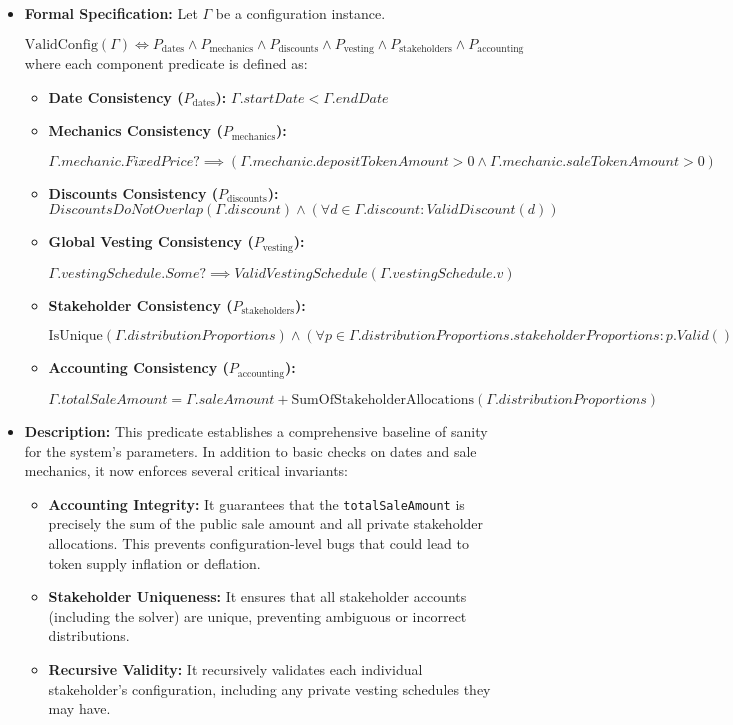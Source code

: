\documentclass[
  english,
  onecolumn]{article}
\providecommand{\tightlist}{%
  \setlength{\itemsep}{0pt}\setlength{\parskip}{0pt}}
\begin{document}
\begin{itemize}
\item
  \textbf{Formal Specification:} Let \(\Gamma\) be a configuration
  instance.

  \(\text{ValidConfig}(\Gamma) \iff P_{\text{dates}} \land P_{\text{mechanics}} \land P_{\text{discounts}} \land P_{\text{vesting}} \land P_{\text{stakeholders}} \land P_{\text{accounting}}\)
  where each component predicate is defined as:

  \begin{itemize}
  \item
    \textbf{Date Consistency (\(P_{\text{dates}}\)):}
    \(\Gamma.startDate < \Gamma.endDate\)
  \item
    \textbf{Mechanics Consistency (\(P_{\text{mechanics}}\)):}

    \(\Gamma.mechanic.FixedPrice? \implies (\Gamma.mechanic.depositTokenAmount > 0 \land \Gamma.mechanic.saleTokenAmount > 0)\)
  \item
    \textbf{Discounts Consistency (\(P_{\text{discounts}}\)):}
    \(DiscountsDoNotOverlap(\Gamma.discount) \land (\forall d \in \Gamma.discount : ValidDiscount(d))\)
  \item
    \textbf{Global Vesting Consistency (\(P_{\text{vesting}}\)):}

    \(\Gamma.vestingSchedule.Some? \implies ValidVestingSchedule(\Gamma.vestingSchedule.v)\)
  \item
    \textbf{Stakeholder Consistency (\(P_{\text{stakeholders}}\)):}

    \(\text{IsUnique}(\Gamma.distributionProportions) \land (\forall p \in \Gamma.distributionProportions.stakeholderProportions : p.Valid())\)
  \item
    \textbf{Accounting Consistency (\(P_{\text{accounting}}\)):}

    \(\Gamma.totalSaleAmount = \Gamma.saleAmount + \text{SumOfStakeholderAllocations}(\Gamma.distributionProportions)\)
  \end{itemize}
\item
  \textbf{Description:} This predicate establishes a comprehensive
  baseline of sanity for the system's parameters. In addition to basic
  checks on dates and sale mechanics, it now enforces several critical
  invariants:

  \begin{itemize}
  \tightlist
  \item
    \textbf{Accounting Integrity:} It guarantees that the
    \texttt{totalSaleAmount} is precisely the sum of the public sale
    amount and all private stakeholder allocations. This prevents
    configuration-level bugs that could lead to token supply inflation
    or deflation.
  \item
    \textbf{Stakeholder Uniqueness:} It ensures that all stakeholder
    accounts (including the solver) are unique, preventing ambiguous or
    incorrect distributions.
  \item
    \textbf{Recursive Validity:} It recursively validates each
    individual stakeholder's configuration, including any private
    vesting schedules they may have.
  \end{itemize}


\end{itemize}
\end{document}
